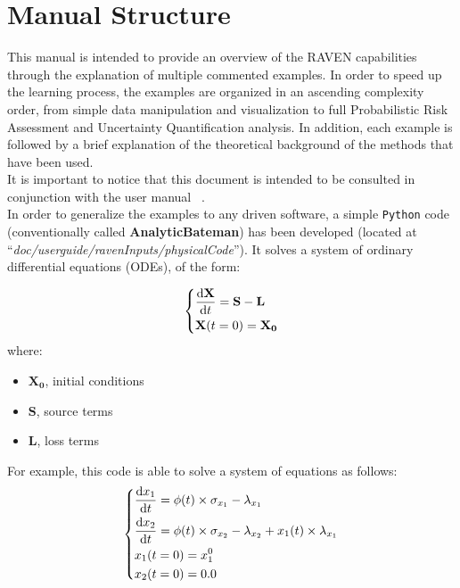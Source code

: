 \section{Manual Structure}
This manual is intended to provide an overview of the RAVEN capabilities through the explanation of multiple commented examples. 
In order to speed up the learning process, the examples are organized in an ascending complexity order, from simple data manipulation and visualization to
full Probabilistic Risk Assessment and Uncertainty Quantification analysis. In addition, each example is followed by a brief explanation of the theoretical background of the methods that have been used.
\\ It is important to notice that this document is intended to be consulted in conjunction with the user manual ~\cite{RAVENuserManual}.
\\ In order to generalize the examples to any driven software, a simple \texttt{Python} code (conventionally called \textbf{AnalyticBateman}) has been developed (located at ``\textit{doc/user\textunderscore guide/ravenInputs/physicalCode}''). It solves a system of ordinary differential equations (ODEs), of the form:

\begin{equation}
\begin{dcases}
\frac{\mathrm{d} \mathbf{X}}{\mathrm{d} t} = \mathbf{S}-\mathbf{L} \\
 \mathbf{X}(t=0)= \mathbf{X_{0}}
\end{dcases}
\end{equation}
   where: 
  \begin{itemize}
     \item $\mathbf{X_{0}}$, initial conditions     
     \item $\mathbf{S}$, source terms 
     \item $\mathbf{L}$, loss terms
   \end{itemize}  

For example, this  code is able to solve a system of equations as follows:
\begin{equation}
  \begin{dcases}
   \frac{\mathrm{d} x_{1}}{\mathrm{d} t} = \phi (t)\times \sigma_{x_{1}}-\lambda_{x_{1}} \\
   \frac{\mathrm{d} x_{2}}{\mathrm{d} t} = \phi (t)\times \sigma_{x_{2}}-\lambda_{x_{2}}+x_{1}(t)\times\lambda_{x_{1}} \\
    x_{1}(t=0)= x_{1}^{0} \\
    x_{2}(t=0)= 0.0
  \end{dcases}
\end{equation}

